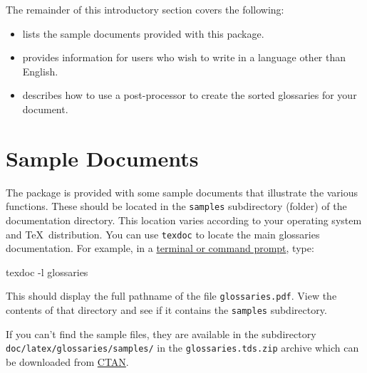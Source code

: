 \documentclass[report]{nlctdoc}
\begin{document}
The remainder of this introductory section covers the following:
\begin{itemize}
\item {} lists the sample documents provided 
with this package.

\item {} provides information for users who
wish to write in a language other than English.

\item {} describes how to use a
post-processor to create the sorted glossaries for your document.

\end{itemize}


\section{Sample Documents}
\label{sec:samples}

The  package is provided with some sample
documents that illustrate the various functions. These should
be located in the \texttt{samples} subdirectory (folder) of the
 documentation directory. This location varies
according to your operating system and \TeX\ distribution. You
can use \texttt{texdoc} to locate the main glossaries documentation.
For example, in a
\href{http://www.dickimaw-books.com/latex/novices/html/terminal.html}{terminal or command prompt}, type:
\begin{prompt}
texdoc -l glossaries
\end{prompt}
This should display the full pathname of the file 
\texttt{glossaries.pdf}. View the contents of that directory and
see if it contains the \texttt{samples} subdirectory.

If you can't find the sample files, they are available in the
subdirectory \texttt{doc/latex/glossaries/samples/} in the
\texttt{glossaries.tds.zip} archive which can be downloaded from
\href{http://tug.ctan.org/tex-archive/macros/latex/contrib/glossaries/}{CTAN}.
\end{document}
